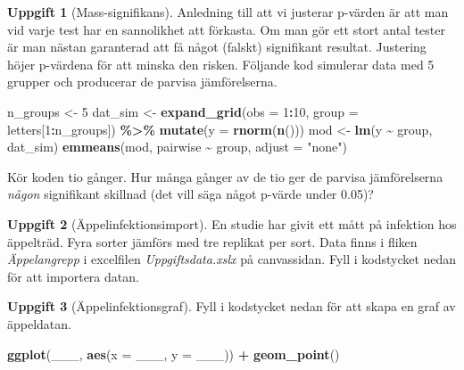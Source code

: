 \documentclass[
]{book}
\newenvironment{Shaded}{\begin{snugshade}}{\end{snugshade}}
\newcommand{\AttributeTok}[1]{\textcolor[rgb]{0.13,0.29,0.53}{#1}}
\newcommand{\DecValTok}[1]{\textcolor[rgb]{0.00,0.00,0.81}{#1}}
\newcommand{\FunctionTok}[1]{\textcolor[rgb]{0.13,0.29,0.53}{\textbf{#1}}}
\newcommand{\NormalTok}[1]{#1}
\newcommand{\OtherTok}[1]{\textcolor[rgb]{0.56,0.35,0.01}{#1}}
\newcommand{\SpecialCharTok}[1]{\textcolor[rgb]{0.81,0.36,0.00}{\textbf{#1}}}
\newcommand{\StringTok}[1]{\textcolor[rgb]{0.31,0.60,0.02}{#1}}
\newcounter{none} %
\theoremstyle{definition}
\theoremstyle{definition}
\theoremstyle{definition}
\newtheorem{exercise}{Uppgift}[chapter]
\theoremstyle{definition}
\theoremstyle{remark}
\begin{document}
\begin{exercise}[Mass-signifikans]
Anledning till att vi justerar p-värden är att man vid varje test har en sannolikhet att förkasta. Om man gör ett stort antal tester är man nästan garanterad att få något (falskt) signifikant resultat. Justering höjer p-värdena för att minska den risken. Följande kod simulerar data med 5 grupper och producerar de parvisa jämförelserna.

\begin{Shaded}
\begin{Highlighting}[]
\NormalTok{n\_groups }\OtherTok{\textless{}{-}} \DecValTok{5}
\NormalTok{dat\_sim }\OtherTok{\textless{}{-}} \FunctionTok{expand\_grid}\NormalTok{(}\AttributeTok{obs =} \DecValTok{1}\SpecialCharTok{:}\DecValTok{10}\NormalTok{, }\AttributeTok{group =}\NormalTok{ letters[}\DecValTok{1}\SpecialCharTok{:}\NormalTok{n\_groups]) }\SpecialCharTok{\%\textgreater{}\%} 
  \FunctionTok{mutate}\NormalTok{(}\AttributeTok{y =} \FunctionTok{rnorm}\NormalTok{(}\FunctionTok{n}\NormalTok{()))}
\NormalTok{mod }\OtherTok{\textless{}{-}} \FunctionTok{lm}\NormalTok{(y }\SpecialCharTok{\textasciitilde{}}\NormalTok{ group, dat\_sim)}
\FunctionTok{emmeans}\NormalTok{(mod, pairwise }\SpecialCharTok{\textasciitilde{}}\NormalTok{ group, }\AttributeTok{adjust =} \StringTok{"none"}\NormalTok{)}
\end{Highlighting}
\end{Shaded}

Kör koden tio gånger. Hur många gånger av de tio ger de parvisa jämförelserna \emph{någon} signifikant skillnad (det vill säga något p-värde under 0.05)?
\end{exercise}

\begin{exercise}[Äppelinfektionsimport]
En studie har givit ett mått på infektion hos äppelträd. Fyra sorter jämförs med tre replikat per sort. Data finns i fliken \emph{Äppelangrepp} i excelfilen \emph{Uppgiftsdata.xslx} på canvassidan. Fyll i kodstycket nedan för att importera datan.
\end{exercise}

\begin{exercise}[Äppelinfektionsgraf]

Fyll i kodstycket nedan för att skapa en graf av äppeldatan.

\begin{Shaded}
\begin{Highlighting}[]
\FunctionTok{ggplot}\NormalTok{(\_\_\_, }\FunctionTok{aes}\NormalTok{(}\AttributeTok{x =}\NormalTok{ \_\_\_, }\AttributeTok{y =}\NormalTok{ \_\_\_)) }\SpecialCharTok{+}
  \FunctionTok{geom\_point}\NormalTok{()}
\end{Highlighting}
\end{Shaded}

\end{exercise}
\end{document}
